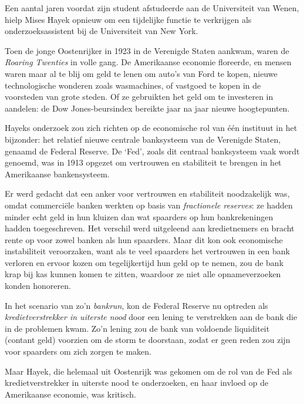 \documentclass[
  a5paper,
  smalldemyvopaper,11pt,twoside,onecolumn,openright,extrafontsizes]{memoir}
\begin{document}
Een aantal jaren voordat zijn student afstudeerde aan de Universiteit
van Wenen, hielp Mises Hayek opnieuw om een tijdelijke functie te
verkrijgen als onderzoeksassistent bij de Universiteit van New York.

Toen de jonge Oostenrijker in 1923 in de Verenigde Staten aankwam, waren
de \emph{Roaring Twenties} in volle gang. De Amerikaanse economie
floreerde, en mensen waren maar al te blij om geld te lenen om auto's
van Ford te kopen, nieuwe technologische wonderen zoals wasmachines, of
vastgoed te kopen in de voorsteden van grote steden. Of ze gebruikten
het geld om te investeren in aandelen: de Dow Jones-beursindex bereikte
jaar na jaar nieuwe hoogtepunten.

Hayeks onderzoek zou zich richten op de economische rol van één
instituut in het bijzonder: het relatief nieuwe centrale banksysteem van
de Verenigde Staten, genaamd de Federal Reserve. De `Fed', zoals dit
centraal banksysteem vaak wordt genoemd, was in 1913 opgezet om
vertrouwen en stabiliteit te brengen in het Amerikaanse bankensysteem.

Er werd gedacht dat een anker voor vertrouwen en stabiliteit
noodzakelijk was, omdat commerciële banken werkten op basis van
\emph{fractionele reserves}: ze hadden minder echt geld in hun kluizen
dan wat spaarders op hun bankrekeningen hadden toegeschreven. Het
verschil werd uitgeleend aan kredietnemers en bracht rente op voor zowel
banken als hun spaarders. Maar dit kon ook economische instabiliteit
veroorzaken, want als te veel spaarders het vertrouwen in een bank
verloren en ervoor kozen om tegelijkertijd hun geld op te nemen, zou de
bank krap bij kas kunnen komen te zitten, waardoor ze niet alle
opnameverzoeken konden honoreren.

In het scenario van zo'n \emph{bankrun}, kon de Federal Reserve nu
optreden als \emph{kredietverstrekker in uiterste nood} door een lening
te verstrekken aan de bank die in de problemen kwam. Zo'n lening zou de
bank van voldoende liquiditeit (contant geld) voorzien om de storm te
doorstaan, zodat er geen reden zou zijn voor spaarders om zich zorgen te
maken.

Maar Hayek, die helemaal uit Oostenrijk was gekomen om de rol van de Fed
als kredietverstrekker in uiterste nood te onderzoeken, en haar invloed
op de Amerikaanse economie, was kritisch.
\end{document}
